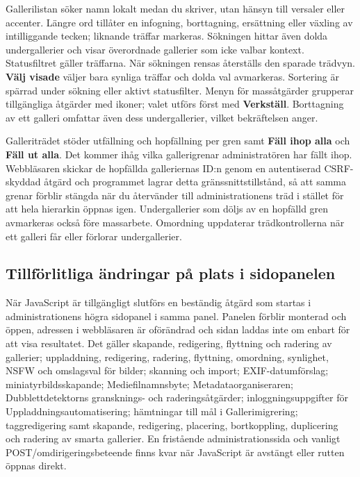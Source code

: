 \documentclass[11pt,a4paper]{article}
\newcommand{\ui}[1]{\textbf{#1}}
\begin{document}
Gallerilistan söker namn lokalt medan du skriver, utan hänsyn till versaler
eller accenter. Längre ord tillåter en infogning, borttagning, ersättning eller
växling av intilliggande tecken; liknande träffar markeras. Sökningen hittar även
dolda undergallerier och visar överordnade gallerier som icke valbar kontext.
Statusfiltret gäller träffarna. När sökningen rensas återställs den sparade
trädvyn. \ui{Välj visade} väljer bara synliga träffar och dolda val avmarkeras.
Sortering är spärrad under sökning eller aktivt statusfilter. Menyn för
massåtgärder grupperar tillgängliga åtgärder med ikoner; valet utförs först med
\ui{Verkställ}. Borttagning av ett galleri omfattar även dess undergallerier,
vilket bekräftelsen anger.

Galleriträdet stöder utfällning och hopfällning per gren samt \ui{Fäll ihop
alla} och \ui{Fäll ut alla}. Det kommer ihåg vilka gallerigrenar administratören
har fällt ihop. Webbläsaren skickar de hopfällda galleriernas ID:n genom en
autentiserad CSRF-skyddad åtgärd och programmet lagrar detta
gränssnittstillstånd, så att samma grenar förblir stängda när du återvänder till
administrationens träd i stället för att hela hierarkin öppnas igen.
Undergallerier som döljs av en hopfälld gren avmarkeras också före massarbete.
Omordning uppdaterar trädkontrollerna när ett galleri får eller förlorar
undergallerier.

\subsection{Tillförlitliga ändringar på plats i sidopanelen}

När JavaScript är tillgängligt slutförs en beständig åtgärd som startas i
administrationens högra sidopanel i samma panel. Panelen förblir monterad och
öppen, adressen i webbläsaren är oförändrad och sidan laddas inte om enbart för
att visa resultatet. Det gäller skapande, redigering, flyttning och radering av
gallerier; uppladdning, redigering, radering, flyttning, omordning, synlighet,
NSFW och omslagsval för bilder; skanning och import; EXIF-datumförslag;
miniatyrbildsskapande; Mediefilnamnsbyte; Metadataorganiseraren;
Dubblettdetektorns gransknings- och raderingsåtgärder; inloggningsuppgifter för
Uppladdningsautomatisering; hämtningar till mål i Gallerimigrering;
taggredigering samt skapande, redigering, placering, bortkoppling, duplicering
och radering av smarta gallerier. En fristående administrationssida och vanligt
POST/omdirigeringsbeteende finns kvar när JavaScript är avstängt eller rutten
öppnas direkt.
\end{document}
